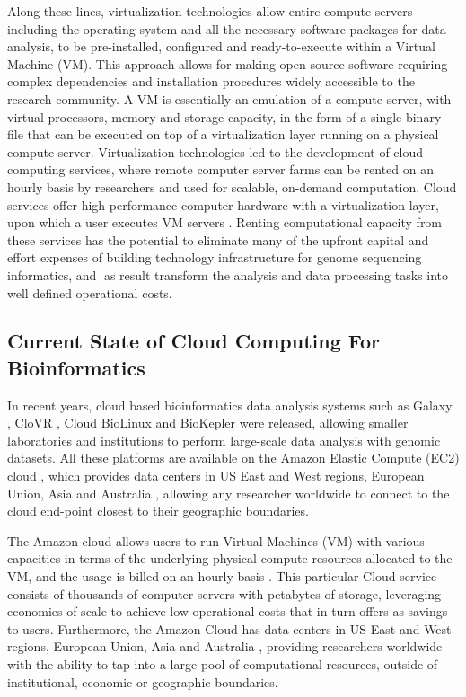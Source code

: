 \documentclass[10pt]{bmc_article}
\newenvironment{bmcformat}{\baselineskip20pt\sloppy\setboolean{publ}{false}}{\baselineskip20pt\sloppy}
\begin{document}
\begin{bmcformat}
Along these lines, virtualization technologies allow entire compute servers including the operating system and 
all the necessary software packages for data analysis, to be pre-installed, configured and ready-to-execute 
within a Virtual Machine (VM).  This approach allows for making open-source software requiring complex dependencies 
and installation procedures widely accessible to the research community. A VM is essentially an emulation of a compute 
server, with virtual processors, memory  and storage capacity, in the form of a single binary file that can be executed on
top of a virtualization layer running on a physical compute server\cite{Uhlig2005}. Virtualization technologies led to the 
development of cloud computing  services, where remote computer server farms can be rented on an hourly basis by 
researchers and used for scalable, on-demand computation. Cloud services offer high-performance computer hardware with a 
virtualization layer, upon which a user executes VM servers \cite{armbrust2010view}. Renting computational capacity from these 
services has the potential to eliminate many of the upfront capital and effort expenses of building technology 
infrastructure for genome sequencing informatics, and as result transform the analysis and data processing 
tasks into well defined operational costs.


\subsection*{Current State of Cloud Computing For Bioinformatics}

In recent years, cloud based bioinformatics data analysis systems such as Galaxy \cite{Goecks2010}, 
CloVR \cite{Angiuoli2011}, Cloud BioLinux \cite{Krampis2012} and BioKepler \cite{Altintas2011} were
released, allowing smaller laboratories and institutions to perform large-scale data analysis with genomic 
datasets. All these platforms are available on the Amazon Elastic Compute (EC2) cloud \cite{awsec2} , which 
provides data centers in US East and West regions, European Union, Asia and Australia \cite{ec2regions}, 
allowing any researcher worldwide  to connect to the cloud end-point closest to their geographic boundaries.  \pb

The Amazon cloud allows users to run Virtual Machines (VM) with various capacities in terms of the underlying
physical compute resources allocated to the VM, and the usage is billed on an hourly basis \cite{ec2price}. 
This particular Cloud service consists of thousands of computer servers with petabytes of storage, leveraging 
economies of scale to achieve low operational costs that in turn offers as savings to users. Furthermore, the Amazon Cloud 
has data centers in US East and West regions, European Union, Asia and Australia \cite{ec2regions}, providing researchers 
worldwide with the ability to tap into a large pool of computational resources, outside of institutional, 
economic or geographic boundaries. \pb


\end{bmcformat}
\end{document}
